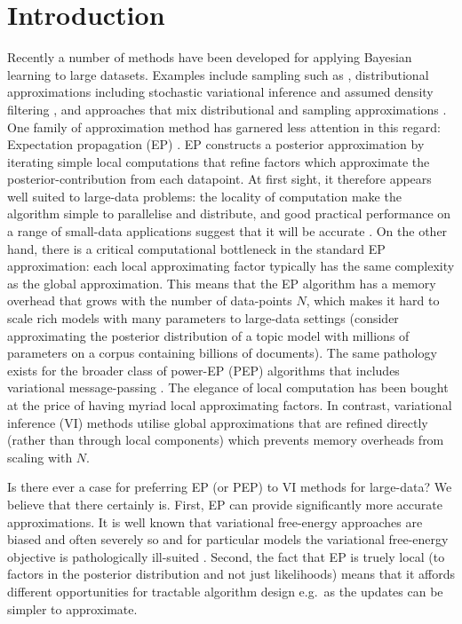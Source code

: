 \section{Introduction}


Recently a number of methods have been developed for applying Bayesian learning to large datasets. Examples include sampling such as \cite{ahn:distributedMCMC, bardenet:MCMC}, distributional approximations including stochastic variational inference \cite{hoffman:svi} and assumed density filtering \cite{miguel:pbp}, and approaches that mix distributional and sampling approximations \cite{gelman:dep,xu:sms}. 
%
One family of approximation method has garnered less attention in this regard: Expectation propagation (EP) \cite{minka:ep}\cite{opper:ec}. EP constructs a posterior approximation by iterating simple local computations that refine factors which approximate the posterior-contribution from each datapoint. At first sight, it therefore appears well suited to large-data problems: the locality of computation make the algorithm simple to parallelise and distribute, and good practical performance on a range of small-data applications suggest that it will be accurate \cite{kuss:gpep,barthelme:ep_likelihood,cunningham:gaussianEP}. On the other hand, there is a critical computational bottleneck in the standard EP approximation: each local approximating factor typically has the same complexity as the global approximation. This means that the EP algorithm has a memory overhead that grows with the number of data-points $N$, which makes it hard to scale rich models with many parameters to large-data settings (consider approximating the posterior distribution of a topic model with millions of parameters on a corpus containing billions of documents). The same pathology exists for the broader class of power-EP (PEP) algorithms \cite{minka:powerep} that includes variational message-passing \cite{winn:vmp}. The elegance of local computation has been bought at the price of having myriad local approximating factors. In contrast, variational inference (VI) methods \cite{jordan:variational,beal:variational} utilise global approximations that are refined directly (rather than through local components) which prevents memory overheads from scaling with $N$. 

Is there ever a case for preferring EP (or PEP) to VI methods for large-data?  We believe that there certainly is. First, EP can provide significantly more accurate approximations. It is well known that variational free-energy approaches are biased and often severely so \cite{turner+sahani:2011a} and for particular models the variational free-energy objective is pathologically ill-suited \cite{cunningham:gaussianEP,turner+sahani:2011c}. Second, the fact that EP is truely local (to factors in the posterior distribution and not just likelihoods) means that it affords different opportunities for tractable algorithm design e.g.~as the updates can be simpler to approximate.

